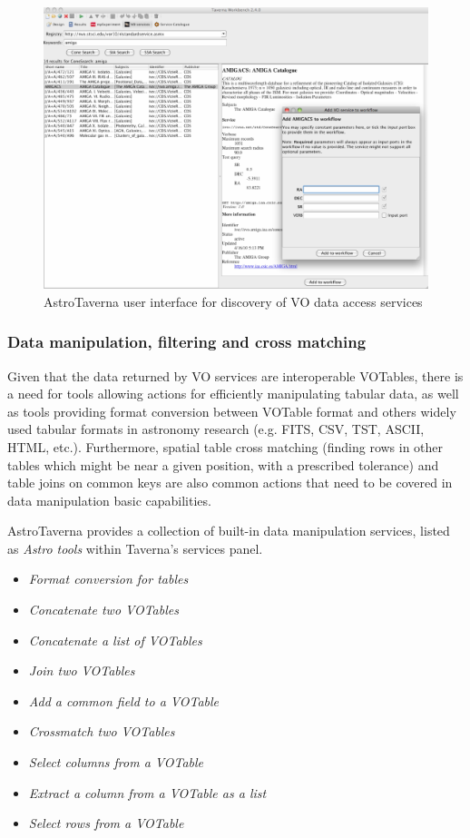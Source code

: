 \documentclass{aa}
\begin{document}
\begin{figure}[tb]
\centering 
\includegraphics[width=0.99\columnwidth]{VODiscovery}
\caption{AstroTaverna user interface for discovery of VO data access services}
\label{fig:VODiscovery}
\end{figure}

\subsubsection{Data manipulation, filtering and cross matching}
\label{DataManipulation}

Given that the data returned by VO services are interoperable VOTables, there is a need for tools allowing actions for efficiently manipulating tabular data, as well as tools providing format conversion between VOTable format and others widely used tabular formats in astronomy research (e.g. FITS, CSV, TST, ASCII, HTML, etc.). Furthermore, spatial table cross matching (finding rows in other tables which might be near a given position, with a prescribed tolerance) and table joins on common keys are also common actions that need to be covered in data manipulation basic capabilities.

AstroTaverna provides a collection of built-in data manipulation services, listed as \textit{Astro tools} within Taverna's services panel.
\begin{itemize}
\item \textit{Format conversion for tables}
\item \textit{Concatenate two VOTables}
\item \textit{Concatenate a list of VOTables}
\item \textit{Join two VOTables}
\item \textit{Add a common field to a VOTable}
\item \textit{Crossmatch two VOTables}
\item \textit{Select columns from a VOTable}
\item \textit{Extract a column from a VOTable as a list}
\item \textit{Select rows from a VOTable}
\end{itemize}
\end{document}
